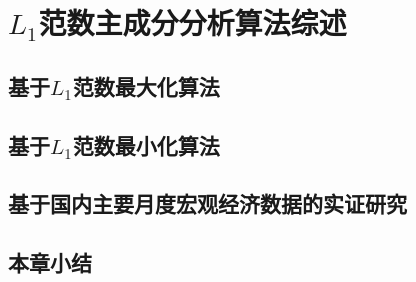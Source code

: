 \section{$L_1$范数主成分分析算法综述}

\subsection{基于$L_1$范数最大化算法}

\subsection{基于$L_1$范数最小化算法}

\subsection{基于国内主要月度宏观经济数据的实证研究}

\subsection{本章小结}